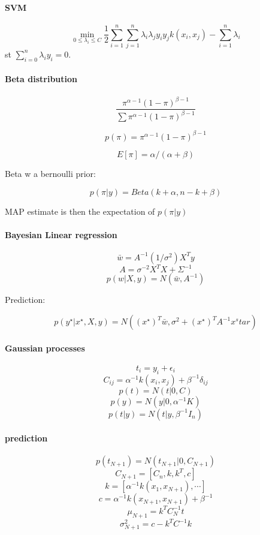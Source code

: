 \documentclass[11pt]{article}
\begin{document}
\paragraph{SVM} 

$$\min_{0 \leq \lambda_i \leq C} \frac{1}{2} \sum_{i=1}^n \sum_{j=1}^n \lambda_i \lambda_j y_i y_j k(x_i, x_j) - \sum_{i=1}^n \lambda_i$$ st $\sum_{i=0}^n \lambda_i y_i = 0$.

\paragraph{Beta distribution}

$$\dfrac{\pi^{\alpha - 1} (1 - \pi)^{\beta - 1}}{\sum \pi^{\alpha - 1} (1 - \pi)^{\beta - 1}}$$

$$p(\pi) = \pi^{\alpha - 1} (1 - \pi)^{\beta - 1}$$

$$E[\pi] = \alpha / (\alpha + \beta)$$

Beta w a bernoulli prior:

$$p(\pi | y) = Beta(k + \alpha, n - k + \beta)$$

MAP estimate is then the expectation of $p(\pi | y)$

\paragraph{Bayesian Linear regression}

$$\bar{w} = A^{-1} (1 / \sigma^2) X^T y$$
$$A = \sigma^{-2} X^T X + \Sigma^{-1}$$
$$p(w | X, y) = N(\bar{w}, A^{-1})$$

Prediction:

$$p(y^\star | x^\star, X, y) = N((x^\star)^T \bar{w}, \sigma^2 + (x^\star)^T A^{-1} x^star)$$

\paragraph{Gaussian processes} 

$$t_i = y_i + \epsilon_i$$
$$C_{ij} = \alpha^{-1} k(x_i, x_j) + \beta^{-1} \delta_{ij}$$
$$p(t) = N(t | 0, C)$$
$$p(y) = N(y | 0, \alpha^{-1} K)$$
$$p(t | y) = N(t | y, \beta^{-1} I_n)$$

\paragraph{prediction} 

$$p(t_{N+1}) = N(t_{N+1} | 0, C_{N+1})$$
$$C_{N+1} = [C_n, k, k^T, c]$$
$$k = [\alpha^{-1} k(x_1, x_{N+1}), \cdots]$$
$$c = \alpha^{-1} k(x_{N+1}, x_{N+1}) + \beta^{-1}$$
$$\mu_{N+1} = k^T C_N^{-1} t$$
$$\sigma^2_{N+1} = c - k^T C^{-1} k$$
\end{document}
